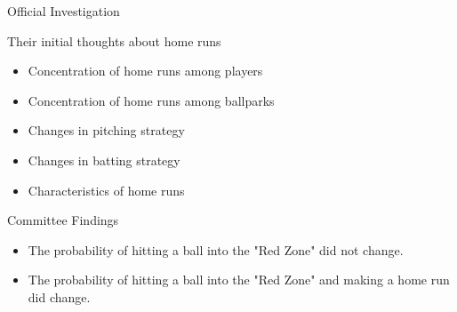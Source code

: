 \documentclass[14pt]{bredelebeamer}
\begin{document}
\begin{frame}{Official Investigation}
  \begin{block}{Their initial thoughts about home runs}
    \begin{itemize}
      \item Concentration of home runs among players
      \item Concentration of home runs among ballparks 
      \item Changes in pitching strategy
      \item Changes in batting strategy
      \item Characteristics of home runs
    \end{itemize}
  \end{block}
    \begin{block}{Committee Findings}
    \begin{itemize}
    \item The probability of hitting a ball into the "Red 		Zone" did not change.
    \item The probability of hitting a ball into the "Red 		Zone" and making a home run did change.
    \end{itemize}
  \end{block}
\end{frame}
\end{document}
